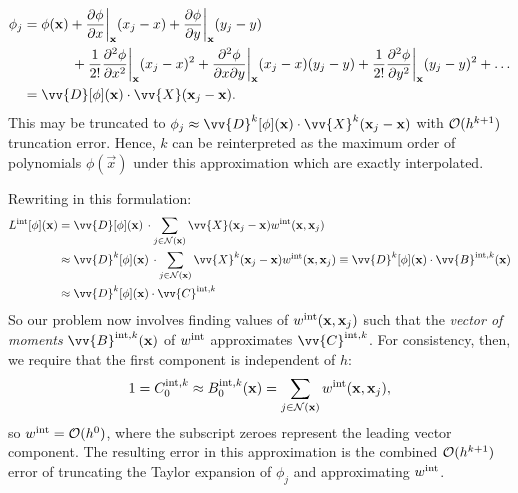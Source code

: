 \begin{subequations}
\begin{align}
\phi_j &= \phi(\vec{x}) + \pdv{\phi}{x}\bigg|_{\vec{x}} (x_j - x) + \pdv{\phi}{y} \bigg|_{\vec{x}} (y_j - y)  \\
& \qquad  \quad \ \, + \frac{1}{2!} \pdv[2]{\phi}{x}\bigg|_{\vec{x}} (x_j - x)^2 + \pdv[2]{\phi}{x}{y}\bigg|_{\vec{x}} (x_j - x) (y_j - y) + \frac{1}{2!} \pdv[2]{\phi}{y}\bigg|_{\vec{x}} (y_j - y)^2 + \dots \\
&= \vv{D}[\phi](\vec{x}) \cdot \vv{X} (\vec{x}_j - \vec{x}).
\end{align}
\end{subequations}
This may be truncated to $\phi_j \approx \vv{D}^k[\phi](\vec{x}) \cdot \vv{X}^k (\vec{x}_j - \vec{x})$ with $\cl{O}(h^{k + 1})$ truncation error. Hence, $k$ can be reinterpreted as the maximum order of polynomials $\phi(\vec{x})$ under this approximation which are exactly interpolated.

Rewriting  in this formulation:
\begin{subequations}
\begin{align}
L^{\rm{int}}[\phi](\vec{x}) &= \vv{D}[\phi](\vec{x}) \, \cdot \sum_{j \in \cl{N}(\vec{x})} \vv{X} (\vec{x}_j - \vec{x}) w^{\rm{int}}(\vec{x}, \vec{x}_j) \\
&\approx \vv{D}^k[\phi](\vec{x}) \, \cdot \sum_{j \in \cl{N}(\vec{x})} \vv{X}^k (\vec{x}_j - \vec{x}) w^{\rm{int}}(\vec{x}, \vec{x}_j) \equiv \vv{D}^k[\phi](\vec{x}) \cdot \vv{B}^{\rm{int}, k}(\vec{x}) \\
&\approx \vv{D}^k[\phi](\vec{x}) \cdot \vv{C}^{\rm{int}, k}
\end{align}
\end{subequations}
So our problem now involves finding values of $w^{\rm{int}}(\vec{x}, \vec{x}_j)$ such that the \emph{vector of moments} $\vv{B}^{\rm{int}, k}(\vec{x})$ of $w^{\rm{int}}$ approximates $\vv{C}^{\rm{int}, k}$. For consistency, then, we require that the first component is independent of $h$:
\begin{equation}
1 = C^{\rm{int}, k}_0 \approx B^{\rm{int}, k}_0(\vec{x}) = \sum_{j \in \cl{N}(\vec{x})} w^{\rm{int}} (\vec{x}, \vec{x}_j),
\end{equation}
so $w^{\rm{int}} = \cl{O}(h^0)$, where the subscript zeroes represent the leading vector component. The resulting error in this approximation is the combined $\cl{O}(h^{k + 1})$ error of truncating the Taylor expansion of $\phi_j$ and approximating $w^{\rm{int}}$.

